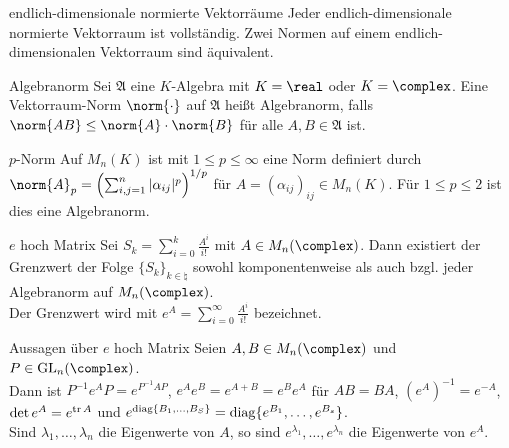 \begin{Satz}{endlich-dimensionale normierte Vektorräume}
    Jeder endlich-dimensionale normierte Vektorraum ist vollständig.
    Zwei Normen auf einem endlich-dimensionalen Vektorraum sind äquivalent.
\end{Satz}

\begin{Def}{Algebranorm}
    Sei $\mathfrak{A}$ eine $K$-Algebra mit $K = \real$ oder $K = \complex$.
    Eine Vektorraum-Norm $\norm{\cdot}$ auf $\mathfrak{A}$ heißt Algebranorm,
    falls $\norm{AB} \le \norm{A} \cdot \norm{B}$ für alle
    $A, B \in \mathfrak{A}$ ist.
\end{Def}

\begin{Def}{$p$-Norm}
    Auf $M_n(K)$ ist mit $1 \le p \le \infty$ eine Norm definiert durch
    $\norm{A}_p = \left(\sum_{i,j=1}^n |\alpha_{ij}|^p\right)^{1/p}$
    für $A = (\alpha_{ij})_{ij} \in M_n(K)$.
    Für $1 \le p \le 2$ ist dies eine Algebranorm.
\end{Def}

\begin{Def}{$e$ hoch Matrix}
    Sei $S_k = \sum_{i=0}^k \frac{A^i}{i!}$ mit $A \in M_n(\complex)$.
    Dann existiert der Grenzwert der Folge $\{S_k\}_{k \in \natural}$ sowohl
    komponentenweise als auch bzgl. jeder Algebranorm auf $M_n(\complex)$. \\
    Der Grenzwert wird mit $e^A = \sum_{i=0}^\infty \frac{A^i}{i!}$
    bezeichnet.
\end{Def}

\begin{Satz}{Aussagen über $e$ hoch Matrix}
    Seien $A, B \in M_n(\complex)$ und $P \in \GL_n(\complex)$. \\
    Dann ist $P^{-1} e^A P = e^{P^{-1} A P}$, \qquad
    $e^A e^B = e^{A + B} = e^B e^A$ für $AB = BA$, \qquad
    $(e^A)^{-1} = e^{-A}$, \\
    $\det e^A = e^{\operatorname{tr} A}$ \quad und \quad
    $e^{\operatorname{diag}\{B_1, \dotsc, B_S\}} = \operatorname{diag}\{e^{B_1}, \dotsc, e^{B_s}\}$. \\
    Sind $\lambda_1, \dotsc, \lambda_n$ die Eigenwerte von $A$, so sind
    $e^{\lambda_1}, \dotsc, e^{\lambda_n}$ die Eigenwerte von $e^A$.
\end{Satz}

